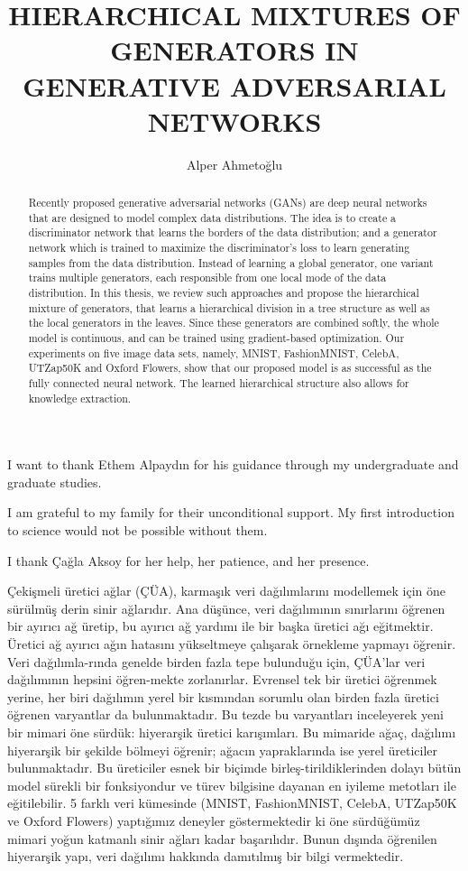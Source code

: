 \documentclass[a4paper,onesided,12pt]{report}
\title{HIERARCHICAL MIXTURES OF GENERATORS IN GENERATIVE ADVERSARIAL NETWORKS}
\author{Alper Ahmetoğlu}
\begin{document}
\makemstitle %
\makeapprovalpage
\begin{acknowledgements}
I want to thank Ethem Alpayd{\i}n for his guidance through my undergraduate and graduate studies.

I am grateful to my family for their unconditional support. My first introduction to science would not be possible without them.

I thank \c{C}a\u{g}la Aksoy for her help, her patience, and her presence.
\end{acknowledgements}
\begin{abstract}
Recently proposed generative adversarial networks (GANs) are deep neural networks that are designed to model complex data distributions. The idea is to create a discriminator network that learns the borders of the data distribution; and a generator network which is trained to maximize the discriminator's loss to learn generating samples from the data distribution. Instead of learning a global generator, one variant trains multiple generators, each responsible from one local mode of the data distribution. In this thesis, we review such approaches and propose the hierarchical mixture of generators, that learns a hierarchical division in a tree structure as well as the local generators in the leaves. Since these generators are combined softly, the whole model is continuous, and can be trained using gradient-based optimization. Our experiments on five image data sets, namely, MNIST, FashionMNIST, CelebA, UTZap50K and Oxford Flowers, show that our proposed model is as successful as the fully connected neural network. The learned hierarchical structure also allows for knowledge extraction.
\end{abstract}
\begin{ozet}
Çekişmeli üretici ağlar (ÇÜA), karmaşık veri dağılımlarını modellemek için öne sürülmüş derin sinir ağlarıdır. Ana düşünce, veri dağılımının sınırlarını öğrenen bir ayırıcı ağ üretip, bu ayırıcı ağ yardımı ile bir başka üretici ağı eğitmektir. Üretici ağ ayırıcı ağın hatasını yükseltmeye çalışarak örnekleme yapmayı öğrenir. Veri dağılımla-rında genelde birden fazla tepe bulunduğu için, ÇÜA'lar veri dağılımının hepsini öğren-mekte zorlanırlar. Evrensel tek bir üretici öğrenmek yerine, her biri dağılımın yerel bir kısmından sorumlu olan birden fazla üretici öğrenen varyantlar da bulunmaktadır. Bu tezde bu varyantları inceleyerek yeni bir mimari öne sürdük: hiyerarşik üretici karışımları. Bu mimaride ağaç, dağılımı hiyerarşik bir şekilde bölmeyi öğrenir; ağacın yapraklarında ise yerel üreticiler bulunmaktadır. Bu üreticiler esnek bir biçimde birleş-tirildiklerinden dolayı bütün model sürekli bir fonksiyondur ve türev bilgisine dayanan en iyileme metotları ile eğitilebilir. 5 farklı veri kümesinde (MNIST, FashionMNIST, CelebA, UTZap50K ve Oxford Flowers) yaptığımız deneyler göstermektedir ki öne sürdüğümüz mimari yoğun katmanlı sinir ağları kadar başarılıdır. Bunun dışında öğrenilen hiyerarşik yapı, veri dağılımı hakkında damıtılmış bir bilgi vermektedir.

\end{ozet}
\end{document}
